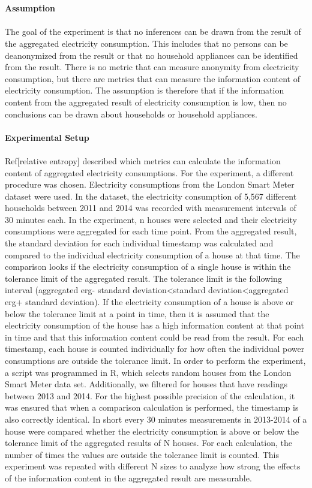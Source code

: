 \\
\\
\textbf{Assumption}
\\
\\
The goal of the experiment is that no inferences can be drawn from the result of the aggregated electricity consumption. This includes that no persons can be deanonymized from the result or that no household appliances can be identified from the result. There is no metric that can measure anonymity from electricity consumption, but there are metrics that can measure the information content of electricity consumption. The assumption is therefore that if the information content from the aggregated result of electricity consumption is low, then no conclusions can be drawn about households or household appliances.
\\
\\
\textbf{Experimental Setup}
\\
\\
Ref[relative entropy] described which metrics can calculate the information content of aggregated electricity consumptions. For the experiment, a different procedure was chosen. Electricity consumptions from the London Smart Meter dataset were used. In the dataset, the electricity consumption of 5,567 different households between 2011 and 2014 was recorded with measurement intervals of 30 minutes each. In the experiment, n houses were selected and their electricity consumptions were aggregated for each time point. From the aggregated result, the standard deviation for each individual timestamp was calculated and compared to the individual electricity consumption of a house at that time. The comparison looks if the electricity consumption of a single house is within the tolerance limit of the aggregated result. The tolerance limit is the following interval (aggregated erg- standard deviation<standard deviation<aggregated erg+ standard deviation).  If the electricity consumption of a house is above or below the tolerance limit at a point in time, then it is assumed that the electricity consumption of the house has a high information content at that point in time and that this information content could be read from the result. For each timestamp, each house is counted individually for how often the individual power consumptions are outside the tolerance limit. In order to perform the experiment, a script was programmed in R, which selects random houses from the London Smart Meter data set. Additionally, we filtered for houses that have readings between 2013 and 2014. For the highest possible precision of the calculation, it was ensured that when a comparison calculation is performed, the timestamp is also correctly identical. In short every 30 minutes measurements in 2013-2014 of a house were compared whether the electricity consumption is above or below the tolerance limit of the aggregated results of N houses. For each calculation, the number of times the values are outside the tolerance limit is counted. This experiment was repeated with different N sizes to analyze how strong the effects of the information content in the aggregated result are measurable.
